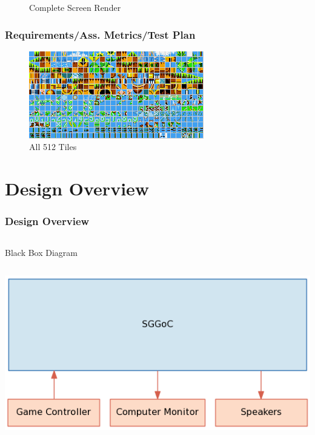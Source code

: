 \documentclass[xcolor=table]{beamer}
\begin{document}
\begin{frame}
\begin{figure}[H]
\begin{minipage}[H]{0.45\linewidth}
            \caption{Complete Screen Render}
            \label{fig:screen}
        \end{minipage}
    \end{figure}
\end{frame}

\begin{frame}
    \frametitle{Requirements/Ass. Metrics/Test Plan}
    \begin{figure}[H]
        \centering
        \begin{minipage}[H]{0.8\linewidth}
            \centering
            \includegraphics[width=\textwidth]{../images/tiles.png}
            \caption{All 512 Tiles}
            \label{fig:tiles}
        \end{minipage}
    \end{figure}
    \vfill
\end{frame}

\section{Design Overview}
\begin{frame}
    \frametitle{Design Overview}
    \begin{columns}[c]
        Black Box Diagram
    \end{columns}
    \begin{center}
        \includegraphics[scale=0.4]{../block_diagrams/block_diagram_external.png}
    \end{center}
\end{frame}
\end{document}
